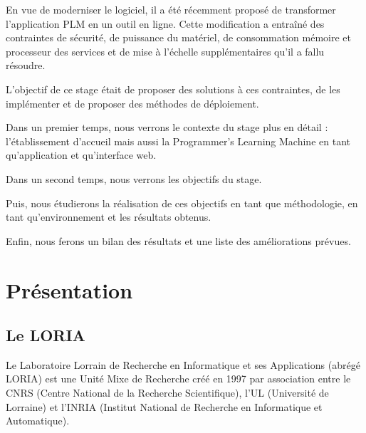 \documentclass[stage]{tnreport}
\begin{document}
En vue de moderniser le logiciel, il a été récemment proposé de transformer l'application PLM en un outil en ligne. Cette modification a entraîné des contraintes de sécurité, de puissance du matériel, de consommation mémoire et processeur des services et de mise à l'échelle supplémentaires qu'il a fallu résoudre.

L'objectif de ce stage était de proposer des solutions à ces contraintes, de les implémenter et de proposer des méthodes de déploiement.

Dans un premier temps, nous verrons le contexte du stage plus en détail : l'établissement d'accueil mais aussi la Programmer's Learning Machine en tant qu'application et qu'interface web.

Dans un second temps, nous verrons les objectifs du stage.

Puis, nous étudierons la réalisation de ces objectifs en tant que méthodologie, en tant qu'environnement et les résultats obtenus.

Enfin, nous ferons un bilan des résultats et une liste des améliorations prévues.

\cleardoublepage

\chapter{Présentation}

\section{Le LORIA}

Le Laboratoire Lorrain de Recherche en Informatique et ses Applications (abrégé LORIA\cite{LR-WS}) est une Unité Mixe de Recherche créé en 1997 par association entre le CNRS (Centre National de la Recherche Scientifique), l'UL (Université de Lorraine) et l'INRIA (Institut National de Recherche en Informatique et Automatique).
\end{document}
